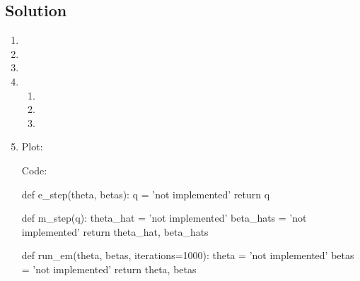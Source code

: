 \documentclass[submit]{harvardml}
\begin{document}
\newpage
\subsection*{Solution}

\begin{enumerate}
  \item
  \item 
  \item 
  \item 
    \begin{enumerate}
      \item 
      \item 
      \item 
    \end{enumerate}
  \item 
    Plot:


    Code:

    \begin{python}
def e_step(theta, betas):
    q = 'not implemented'
    return q


def m_step(q):
    theta_hat = 'not implemented'
    beta_hats = 'not implemented'
    return theta_hat, beta_hats


def run_em(theta, betas, iterations=1000):
    theta = 'not implemented'
    betas = 'not implemented'
    return theta, betas
    \end{python}
\end{enumerate}


\newpage
\end{document}
